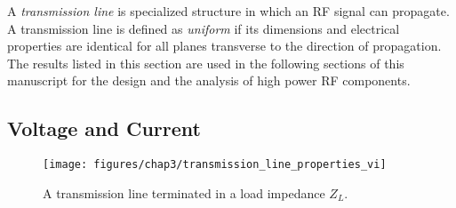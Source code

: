 A \textit{transmission line} is specialized structure in which an RF signal can propagate. A transmission line is defined as \textit{uniform} if its dimensions and electrical properties are identical for all planes transverse to the direction of propagation. The results listed in this section are used in the following sections of this manuscript for the design and the analysis of high power RF components.

\subsection{Voltage and Current}

\begin{figure}
	\texttt{[image: figures/chap3/transmission\_line\_properties\_vi]}
	\caption{A transmission line terminated in a load impedance $Z_L$.}
	\label{fig:transmissionlinepropertiesvi}
\end{figure}

